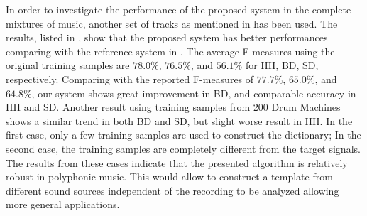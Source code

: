 \documentclass{article}
\begin{document}
In order to investigate the performance of the proposed system in the complete mixtures of music, another set of tracks as mentioned in  has been used. The results, listed in , show that the proposed system has better performances comparing with the reference system in \cite{gillet_transcription_2008}. The average F-measures using the original training samples are $78.0\%$, $76.5\%$, and $56.1\%$ for HH, BD, SD, respectively. Comparing with the reported F-measures of $77.7\%$, $65.0\%$, and $64.8\%$, our system shows great improvement in BD, and comparable accuracy in HH and SD. Another result using training samples from 200 Drum Machines shows a similar trend in both BD and SD, but slight worse result in HH. In the first case, only a few training samples are used to construct the dictionary; In the second case, the training samples are completely different from the target signals. The results from these cases indicate that the presented algorithm is relatively robust in polyphonic music. This would allow to construct a template from different sound sources independent of the recording to be analyzed allowing more general applications.
\end{document}
